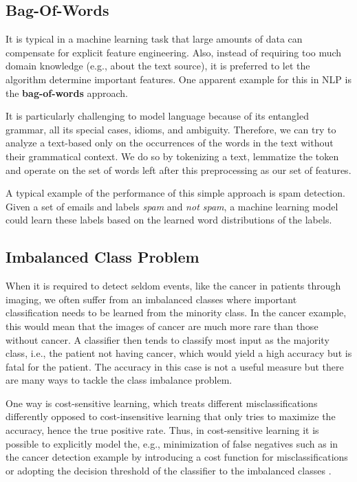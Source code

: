 \subsection{Bag-Of-Words}\label{section:bow}
It is typical in a machine learning task that large amounts of data can compensate for explicit feature engineering.
Also, instead of requiring too much domain knowledge (e.g., about the text source), it is preferred to let the algorithm determine important features.
One apparent example for this in NLP is the \textbf{bag-of-words} approach.

It is particularly challenging to model language because of its entangled grammar, all its special cases, idioms, and ambiguity.
Therefore, we can try to analyze a text-based only on the occurrences of the words in the text without their grammatical context. We do so by tokenizing a text, lemmatize the token and operate on the set of words left after this preprocessing as our set of features.

A typical example of the performance of this simple approach is spam detection.
Given a set of emails and labels \emph{spam} and \emph{not spam}, a machine learning model could learn these labels based on the learned word distributions of the labels.

\subsection{Imbalanced Class Problem}
When it is required to detect seldom events, like the cancer in patients through imaging, we often suffer from an imbalanced classes where important classification needs to be learned from the minority class. In the cancer example, this would mean that the images of cancer are much more rare than those without cancer. A classifier then tends to classify most input as the majority class, i.e., the patient not having cancer, which would yield a high accuracy but is fatal for the patient. The accuracy in this case is not a useful measure but there are many ways to tackle the class imbalance problem.

One way is cost-sensitive learning, which treats different misclassifications differently opposed to cost-insensitive learning that only tries to maximize the accuracy, hence the true positive rate. Thus, in cost-sensitive learning it is possible to explicitly model the, e.g.,  minimization of false negatives such as in the cancer detection example by introducing a cost function for misclassifications or adopting the decision threshold of the classifier to the imbalanced classes \citep{Ling2008}.

